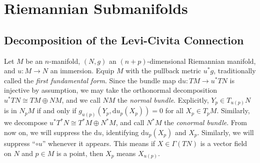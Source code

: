 \documentclass{book}
\renewcommand{\d}{\mathrm{d}}
\theoremstyle{definition}
\numberwithin{equation}{section}
\begin{document}
\chapter{Riemannian Submanifolds}
\section{Decomposition of the Levi-Civita Connection}

Let $M$ be an $n$-manifold, $(N,g)$ an $(n+p)$-dimensional Riemannian manifold, and $u \colon M \to N$ an immersion. Equip $M$ with the pullback metric $u^*g$, traditionally called the \textit{first fundamental form}. Since the bundle map $\d u \colon TM \to u^* TN$ is injective by assumption, we may take the orthonormal decomposition $u^* TN \cong TM \oplus NM$, and we call $NM$ the \textit{normal bundle}. Explicitly, $Y_p \in T_{u(p)}N$ is in $N_p M$ if and only if $g_{u(p)}(Y_p,\d{u}_p(X_p)) = 0$ for all $X_p \in T_p M$. Similarly, we decompose $u^* T^*N \cong T^*M \oplus N^*M$, and call $N^*M$ the \textit{conormal bundle}. From now on, we will suppress the $\d{u}$, identifying $\d{u}_p(X_p)$ and $X_p$. Similarly, we will suppress ``$\circ u$'' whenever it appears. This means if $X \in \Gamma(TN)$ is a vector field on $N$ and $p \in M$ is a point, then $X_p$ means $X_{u(p)}$.
\end{document}
